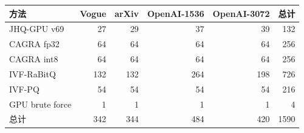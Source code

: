 \begin{tabular}{@{}lrrrrr@{}}
\toprule
方法 & Vogue & arXiv & OpenAI-1536 & OpenAI-3072 & 总计 \\
\midrule
JHQ-GPU v69 & 27 & 29 & 37 & 39 & 132 \\
CAGRA fp32 & 64 & 64 & 64 & 64 & 256 \\
CAGRA int8 & 64 & 64 & 64 & 64 & 256 \\
IVF-RaBitQ & 132 & 132 & 264 & 198 & 726 \\
IVF-PQ & 54 & 54 & 54 & 54 & 216 \\
GPU brute force & 1 & 1 & 1 & 1 & 4 \\
\midrule
总计 & 342 & 344 & 484 & 420 & 1590 \\
\bottomrule
\end{tabular}
